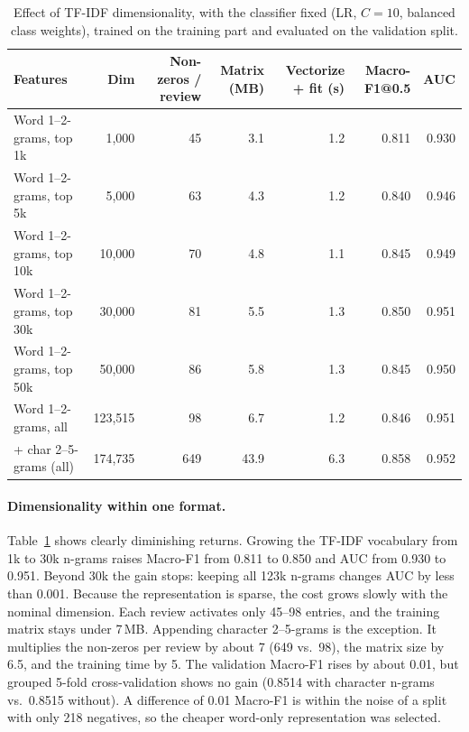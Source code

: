 \begin{table}[!htbp]
\centering
\caption{Effect of TF-IDF dimensionality, with the classifier fixed (LR, $C{=}10$, balanced class weights), trained on the training part and evaluated on the validation split.}
\label{tab:g-dims}
\footnotesize
\setlength{\tabcolsep}{3pt}
\begin{tabular}{l r r r r r r}
\toprule
Features & Dim & Non-zeros / review & Matrix (MB) & Vectorize + fit (s) & Macro-F1@0.5 & AUC \\
\midrule
Word 1--2-grams, top 1k   & 1{,}000   & 45  & 3.1  & 1.2 & 0.811 & 0.930 \\
Word 1--2-grams, top 5k   & 5{,}000   & 63  & 4.3  & 1.2 & 0.840 & 0.946 \\
Word 1--2-grams, top 10k  & 10{,}000  & 70  & 4.8  & 1.1 & 0.845 & 0.949 \\
Word 1--2-grams, top 30k  & 30{,}000  & 81  & 5.5  & 1.3 & 0.850 & 0.951 \\
Word 1--2-grams, top 50k  & 50{,}000  & 86  & 5.8  & 1.3 & 0.845 & 0.950 \\
Word 1--2-grams, all      & 123{,}515 & 98  & 6.7  & 1.2 & 0.846 & 0.951 \\
\quad + char 2--5-grams (all) & 174{,}735 & 649 & 43.9 & 6.3 & 0.858 & 0.952 \\
\bottomrule
\end{tabular}
\end{table}

\paragraph{Dimensionality within one format.}
Table~\ref{tab:g-dims} shows clearly diminishing returns.
Growing the TF-IDF vocabulary from 1k to 30k n-grams raises Macro-F1 from 0.811 to 0.850 and AUC from 0.930 to 0.951. Beyond 30k the gain stops: keeping all 123k n-grams changes AUC by less than 0.001.
Because the representation is sparse, the cost grows slowly with the nominal dimension. Each review activates only 45--98 entries, and the training matrix stays under 7\,MB.
Appending character 2--5-grams is the exception. It multiplies the non-zeros per review by about 7 (649 vs.\ 98), the matrix size by 6.5, and the training time by 5.
The validation Macro-F1 rises by about 0.01, but grouped 5-fold cross-validation shows no gain (0.8514 with character n-grams vs.\ 0.8515 without).
A difference of 0.01 Macro-F1 is within the noise of a split with only 218 negatives, so the cheaper word-only representation was selected.

